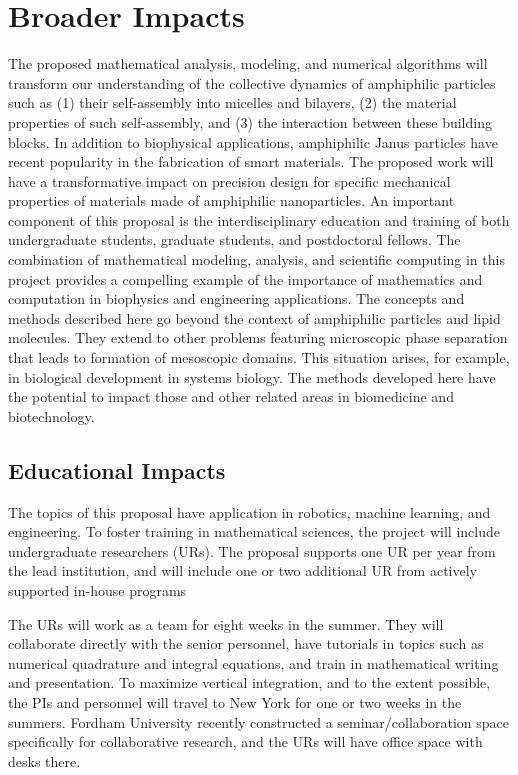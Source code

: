 \section{Broader Impacts}
\label{sec:BroaderImpacts}

The proposed mathematical analysis, modeling, and numerical algorithms
will transform our understanding of the collective dynamics of
amphiphilic particles such as (1) their self-assembly into micelles and
bilayers, (2) the material properties of such self-assembly, and (3) the
interaction between these building blocks. In addition to biophysical
applications, amphiphilic Janus particles have recent popularity in the
fabrication of smart materials. The proposed work will have a
transformative impact on precision design for specific mechanical
properties of materials made of amphiphilic nanoparticles. An important
component of this proposal is the interdisciplinary education and
training of both undergraduate students, graduate students, and
postdoctoral fellows. The combination of mathematical modeling,
analysis, and scientific computing in this project provides a compelling
example of the importance of mathematics and computation in biophysics
and engineering applications. The concepts and methods described here go
beyond the context of amphiphilic particles and lipid molecules. They
extend to other problems featuring microscopic phase separation that
leads to formation of mesoscopic domains. This situation arises, for
example, in biological development in systems biology. The methods
developed here have the potential to impact those and other related
areas in biomedicine and biotechnology.

\subsection{Educational Impacts}
\label{subsec:Educational_plans}
The topics of this proposal have application in robotics, machine
learning, and engineering. To foster training in mathematical sciences,
the project will include undergraduate researchers (URs). The proposal
supports one UR per year from the lead institution, and will include one
or two additional UR from actively supported in-house programs

The URs will work as a team for eight weeks in the summer. They will
collaborate directly with the senior personnel, have tutorials in topics
such as numerical quadrature and integral equations, and train in
mathematical writing and presentation. To maximize vertical integration,
and to the extent possible, the PIs and personnel will travel to New
York for one or two weeks in the summers. Fordham University recently
constructed a seminar/collaboration space specifically for collaborative
research, and the URs will have office space with desks there.

